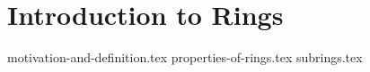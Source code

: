\chapter{Introduction to Rings}
{motivation-and-definition.tex}
{properties-of-rings.tex}
{subrings.tex}
